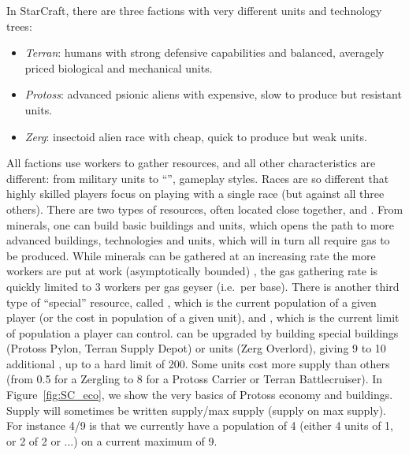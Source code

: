 In StarCraft, there are three factions with very different units and technology trees:
\begin{itemize}
    \item \textit{Terran}: humans with strong defensive capabilities and balanced, averagely priced biological and mechanical units.
    \item \textit{Protoss}: advanced psionic aliens with expensive, slow to produce but resistant units.
    \item \textit{Zerg}: insectoid alien race with cheap, quick to produce but weak units.
\end{itemize}

All factions use workers to gather resources, and all other characteristics are different: from military units to ``'', gameplay styles. Races are so different that highly skilled players focus on playing with a single race (but against all three others). There are two types of resources, often located close together,  and . From minerals, one can build basic buildings and units, which opens the path to more advanced buildings, technologies and units, which will in turn all require gas to be produced. While minerals can be gathered at an increasing rate the more workers are put at work (asymptotically bounded) , the gas gathering rate is quickly limited to 3 workers per gas geyser (i.e.~per base). There is another third type of ``special'' resource, called \textit{}, which is the current population of a given player (or the cost in population of a given unit), and \textit{}, which is the current limit of population a player can control.  can be upgraded by building special buildings (Protoss Pylon, Terran Supply Depot) or units (Zerg Overlord), giving 9 to 10 additional , up to a hard limit of 200. Some units cost more supply than others (from 0.5 for a Zergling to 8 for a Protoss Carrier or Terran Battlecruiser). In Figure~\ref{fig:SC_eco}, we show the very basics of Protoss economy and buildings. Supply will sometimes be written supply/max supply (supply on max supply). For instance 4/9 is that we currently have a population of 4 (either 4 units of 1, or 2 of 2 or ...) on a current maximum of 9. %

